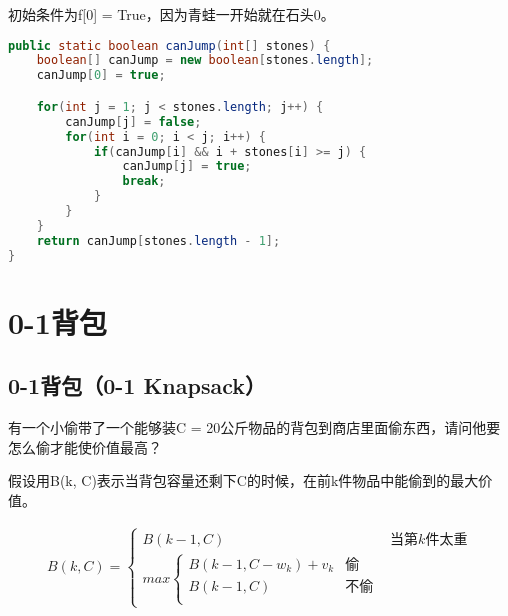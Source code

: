 初始条件为f[0] = True，因为青蛙一开始就在石头0。\\


\begin{lstlisting}[language=Java]
public static boolean canJump(int[] stones) {
	boolean[] canJump = new boolean[stones.length];
	canJump[0] = true;

	for(int j = 1; j < stones.length; j++) {
		canJump[j] = false;
		for(int i = 0; i < j; i++) {
			if(canJump[i] && i + stones[i] >= j) {
				canJump[j] = true;
				break;
			}
		}
	}
	return canJump[stones.length - 1];
}
\end{lstlisting}

\newpage

\section{0-1背包}

\subsection{0-1背包（0-1 Knapsack）}

有一个小偷带了一个能够装C = 20公斤物品的背包到商店里面偷东西，请问他要怎么偷才能使价值最高？

\begin{table}[H]
	\centering
	\caption{物品信息}
\end{table}

假设用B(k, C)表示当背包容量还剩下C的时候，在前k件物品中能偷到的最大价值。

\vspace{-0.5cm}

\begin{align*}
	B(k, C) = \begin{cases}
		B(k-1, C) & \text{当第}k\text{件太重} \\
		max \begin{cases}
			B(k-1, C-w_k) + v_k & \text{偷}   \\
			B(k-1, C)           & \text{不偷} \\
		\end{cases}
	\end{cases}
\end{align*}

